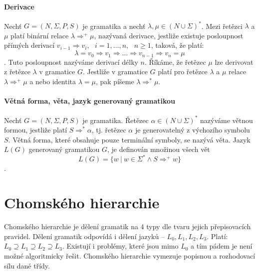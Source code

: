 \paragraph*{Derivace} Nechť $G = (N, \Sigma, P, S)$ je gramatika a nechť $\lambda, \mu \in (N \cup \Sigma)^*$. Mezi řetězci $\lambda$ a $\mu$ platí binární relace $\lambda \Rightarrow^+ \mu$, nazývaná derivace, jestliže existuje posloupnost přímých derivací $v_{i-1} \Rightarrow v_i,~~~ i=1, \dots, n,~~~ n \geq 1$, taková, že platí: $$\lambda = v_0 \Rightarrow v_1 \Rightarrow \dots \Rightarrow v_{n-1} \Rightarrow v_n = \mu$$. Tuto posloupnost nazýváme derivací délky $n$. Říkáme, že řetězec $\mu$ lze derivovat z řetězce $\lambda$ v gramatice $G$. Jestliže v gramatice $G$ platí pro řetězce $\lambda$ a $\mu$ relace $\lambda \Rightarrow^+ \mu$ a nebo identita $\lambda = \mu$, pak píšeme $\lambda \Rightarrow^* \mu$.

\paragraph*{Větná forma, věta, jazyk generovaný gramatikou} Nechť $G = (N, \Sigma, P, S)$ je gramatika. Řetězec $\alpha \in (N \cup \Sigma)^*$ nazýváme větnou formou, jestliže platí $S \Rightarrow^* \alpha$, tj. řetězec $\alpha$ je generovatelný z výchozího symbolu $S$. Větná forma, které obsahuje pouze terminální symboly, se nazývá věta. Jazyk $L(G)$ generovaný gramatikou $G$, je definován množinou všech vět $$L(G) = \{ w ~|~ w \in \Sigma^* \land S \Rightarrow^+ w \}$$.


\section{Chomského hierarchie}

Chomského hierarchie je dělení gramatik na 4 typy dle tvaru jejich přepisovacích pravidel. Dělení gramatik odpovídá i dělení jazyků -- $L_0, L_1, L_2, L_3$. Platí: $L_0 \supseteq L_1 \supseteq L_2 \supseteq L_3$. Existují i problémy, které jsou mimo $L_0$ a tím pádem je není možné algoritmicky řešit. Chomského hierarchie vymezuje popisnou a rozhodovací sílu dané třídy.

